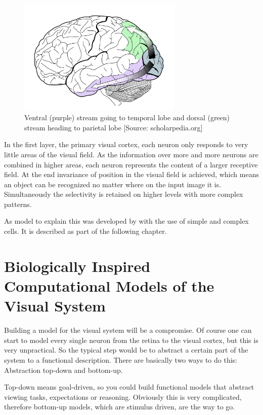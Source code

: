 		\begin{figure}[H]
			\centering
			\captionsetup{justification=centering,margin=2.3cm}
			\includegraphics[width=0.7\textwidth]{images/visual-stream2.pdf}
			\caption{Ventral (purple) stream going to temporal lobe and dorsal (green) stream heading to parietal lobe [Source: scholarpedia.org]}
		\end{figure}
		
		In the first layer, the primary visual cortex, each neuron only responds to very little areas of the visual field. As the information over more and more neurons are combined in higher areas, each neuron represents the content of a larger receptive field. At the end invariance of position in the visual field is achieved, which means an object can be recognized no matter where on the input image it is. Simultaneously the selectivity is retained on higher levels with more complex patterns.
		
		As model to explain this was developed by \citeauthor{hubel1962receptive} with the use of simple and complex cells. It is described as part of the following chapter.
		
\chapter{Biologically Inspired Computational Models of the Visual System}

	Building a model for the visual system will be a compromise. Of course one can start to model every single neuron from the retina to the visual cortex, but this is very unpractical. So the typical step would be to abstract a certain part of the system to a functional description. There are basically two ways to do this: Abstraction top-down and bottom-up.
	
	Top-down means goal-driven, so you could build functional models that abstract viewing tasks, expectations or reasoning. Obviously this is very complicated, therefore bottom-up models, which are stimulus driven, are the way to go.
	
